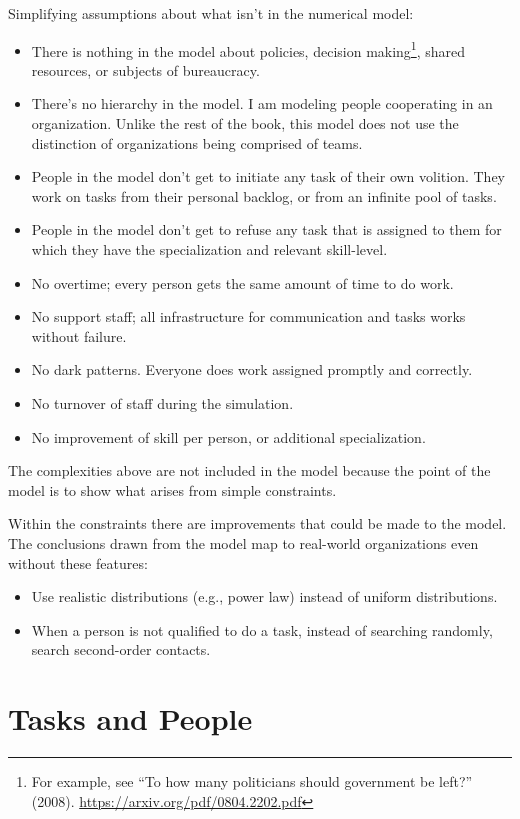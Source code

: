 Simplifying assumptions about what isn't in the numerical model:
\begin{itemize}
    \item There is nothing in the model about policies, decision making\footnote{For example, see ``To how many politicians should government be left?'' (2008). \href{https://arxiv.org/pdf/0804.2202.pdf}{https://arxiv.org/pdf/0804.2202.pdf}}, shared resources, or subjects of bureaucracy. 
    \item There's no hierarchy in the model. I am modeling people cooperating in an organization. Unlike the rest of the book, this model does not use the distinction of organizations being comprised of teams.
    \item People in the model don't get to initiate any task of their own volition. They work on tasks from their personal backlog, or from an infinite pool of tasks.
    \item People in the model don't get to refuse any task that is assigned to them for which they have the specialization and relevant skill-level.
    \item No overtime; every person gets the same amount of time to do work.
    \item No support staff; all infrastructure for communication and tasks works without failure.
    \item No dark patterns. Everyone does work assigned promptly and correctly.
    \item No turnover of staff during the simulation.
    \item No improvement of skill per person, or additional specialization.
\end{itemize}
The complexities above are not included in the model because the point of the model is to show what arises from simple constraints. 

Within the constraints there are improvements that could be made to the model.%
The conclusions drawn from the model map to real-world organizations even without these features: 
\begin{itemize}
    \item Use realistic distributions (e.g., power law) instead of uniform distributions.
    \item When a person is not qualified to do a task, instead of searching randomly, search second-order contacts.
\end{itemize}

\section{Tasks and People}

